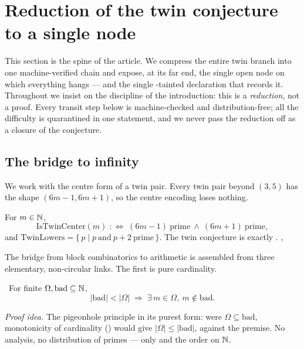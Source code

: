 \section{Reduction of the twin conjecture to a single node}\label{sec:reduction}

This section is the spine of the article. We compress the entire twin branch into one
machine-verified chain and expose, at its far end, the single open node on which everything hangs
--- and the single -tainted declaration  that records it.
Throughout we insist on the discipline of the introduction: this is a \emph{reduction}, not a proof.
Every transit step below is \green{} machine-checked and distribution-free; all the difficulty is
quarantined in one \red{} statement, and we never pass the reduction off as a closure of the
conjecture.

\subsection{The bridge to infinity}

We work with the centre form of a twin pair. Every twin pair beyond $(3,5)$ has the shape
$(6m-1,6m+1)$, so the centre encoding loses nothing.

\begin{definition}\label{def:istwincenter}
For $m\in\mathbb{N}$,
\[
  \mathrm{IsTwinCenter}(m)\;:\Longleftrightarrow\;(6m-1)\ \text{prime}\ \wedge\ (6m+1)\ \text{prime},
\]
and $\mathrm{TwinLowers}=\{\,p\mid p\ \text{and}\ p+2\ \text{prime}\,\}$. The twin conjecture is
exactly . , 
\end{definition}

The bridge from block combinatorics to arithmetic is assembled from three elementary, non-circular
links. The first is pure cardinality.

\begin{theorem}\label{thm:survivor_of_not_covered}
\green{}\ For finite $\Omega,\mathrm{bad}\subseteq\mathbb{N}$,
\begin{equation}\label{eq:survivor}
  |\mathrm{bad}|<|\Omega|\;\Longrightarrow\;\exists\,m\in\Omega,\ m\notin\mathrm{bad}.
\end{equation}
\end{theorem}

\emph{Proof idea.} The pigeonhole principle in its purest form: were $\Omega\subseteq\mathrm{bad}$,
monotonicity of cardinality () would give $|\Omega|\le|\mathrm{bad}|$,
against the premise. No analysis, no distribution of primes --- only  and the order on
$\mathbb{N}$.

